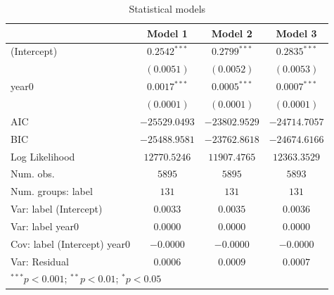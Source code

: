 
\begin{table}
\begin{center}
\begin{tabular}{l c c c}
\hline
 & Model 1 & Model 2 & Model 3 \\
\hline
(Intercept)                  & $0.2542^{***}$ & $0.2799^{***}$ & $0.2835^{***}$ \\
                             & $(0.0051)$     & $(0.0052)$     & $(0.0053)$     \\
year0                        & $0.0017^{***}$ & $0.0005^{***}$ & $0.0007^{***}$ \\
                             & $(0.0001)$     & $(0.0001)$     & $(0.0001)$     \\
\hline
AIC                          & $-25529.0493$  & $-23802.9529$  & $-24714.7057$  \\
BIC                          & $-25488.9581$  & $-23762.8618$  & $-24674.6166$  \\
Log Likelihood               & $12770.5246$   & $11907.4765$   & $12363.3529$   \\
Num. obs.                    & $5895$         & $5895$         & $5893$         \\
Num. groups: label           & $131$          & $131$          & $131$          \\
Var: label (Intercept)       & $0.0033$       & $0.0035$       & $0.0036$       \\
Var: label year0             & $0.0000$       & $0.0000$       & $0.0000$       \\
Cov: label (Intercept) year0 & $-0.0000$      & $-0.0000$      & $-0.0000$      \\
Var: Residual                & $0.0006$       & $0.0009$       & $0.0007$       \\
\hline
\multicolumn{4}{l}{\scriptsize{$^{***}p<0.001$; $^{**}p<0.01$; $^{*}p<0.05$}}
\end{tabular}
\caption{Statistical models}
\label{table:coefficients}
\end{center}
\end{table}
